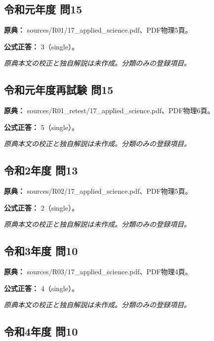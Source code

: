 \subsection{令和元年度 問15}
\label{q:r01-reg-applied-15}

\noindent\textbf{原典：} sources/R01/17\_applied\_science.pdf、PDF物理5頁。

\textbf{公式正答：} 3（single）。

\par\textit{原典本文の校正と独自解説は未作成。分類のみの登録項目。}

\subsection{令和元年度再試験 問15}
\label{q:r01-ret-applied-15}

\noindent\textbf{原典：} sources/R01\_retest/17\_applied\_science.pdf、PDF物理6頁。

\textbf{公式正答：} 5（single）。

\par\textit{原典本文の校正と独自解説は未作成。分類のみの登録項目。}

\subsection{令和2年度 問13}
\label{q:r02-reg-applied-13}

\noindent\textbf{原典：} sources/R02/17\_applied\_science.pdf、PDF物理5頁。

\textbf{公式正答：} 2（single）。

\par\textit{原典本文の校正と独自解説は未作成。分類のみの登録項目。}

\subsection{令和3年度 問10}
\label{q:r03-reg-applied-10}

\noindent\textbf{原典：} sources/R03/17\_applied\_science.pdf、PDF物理4頁。

\textbf{公式正答：} 4（single）。

\par\textit{原典本文の校正と独自解説は未作成。分類のみの登録項目。}

\subsection{令和4年度 問10}
\label{q:r04-reg-applied-10}

